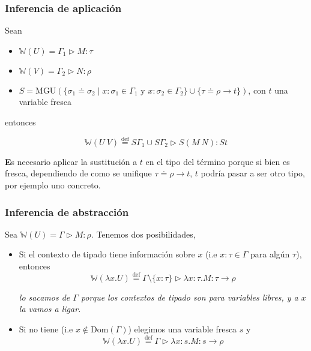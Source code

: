 \documentclass{report}
\theoremstyle{definition} %
\newenvironment{nota}[1]
    {\begin{leftbar}\textbf{#1}}
    {\end{leftbar}}
\newcommand{\eqdef}{\overset{\text{def}}{=}}
\newcommand{\tfunc}[2]{#1 \to #2}
\newcommand{\abs}[3]{\lambda #1 : #2 . #3}
\newcommand{\app}[2]{#1 \ #2} %
\newcommand{\uabs}[2]{\lambda #1 . #2} %
\newcommand{\tipa}[3]{#1 \rhd #2 : #3} %
\newcommand{\tienetipo}[3]{#1 : #2 \in #3}
\newcommand{\Gtipa}[2]{\tipa{\Gamma}{#1}{#2}}
\newcommand{\tsust}[1]{S#1} %
\newcommand{\infer}[1]{\mathbb{W}(#1)}
\newcommand{\unify}[2]{#1 \doteq #2}
\begin{document}
\subsubsection{Inferencia de aplicación}

Sean

\begin{itemize}
    \item $\infer{U} = \tipa{\Gamma_1}{M}{\tau}$
    \item $\infer{V} = \tipa{\Gamma_2}{N}{\rho}$
    \item $S = \text{MGU} (
        \{
            \unify{\sigma_1}{\sigma_2} \mid
            x : \sigma_1 \in \Gamma_1
            \text{ y } x : \sigma_2 \in \Gamma_2
        \}
        \cup \{ \unify{\tau}{\tfunc{\rho}{t}} \}
    )$, con $t$ una variable fresca
\end{itemize}

entonces

\[
    \infer{\app{U}{V}} \eqdef
    \tipa
        {\tsust{\Gamma_1} \cup \tsust{\Gamma_2}}
        {\tsust{(\app{M}{N})}}
        {\tsust{t}}
\]

\begin{nota}
    Es necesario aplicar la sustitución a $t$ en el tipo del término porque si
    bien es fresca, dependiendo de como se unifique
    $\unify{\tau}{\tfunc{\rho}{t}}$, $t$ podría pasar a ser otro tipo, por
    ejemplo uno concreto.
\end{nota}

\subsubsection{Inferencia de abstracción}

Sea $\infer{U} = \Gtipa{M}{\rho}$. Tenemos dos posibilidades,

\begin{itemize}
    \item Si el contexto de tipado tiene información sobre $x$
    (i.e $\tienetipo{x}{\tau}{\Gamma}$ para algún $\tau$), entonces
    \[
        \infer{\uabs{x}{U}} \eqdef
        \tipa
            {\Gamma \setminus \{ x: \tau\}}
            {\abs{x}{\tau}{M}}
            {\tfunc{\tau}{\rho}}
    \]

    \textit{lo sacamos de $\Gamma$ porque los contextos de tipado son para variables libres, y a $x$ la vamos a ligar.}

    \item Si no tiene (i.e $x \notin \text{Dom}({\Gamma})$) elegimos una
    variable fresca $s$ y
    \[
        \infer{\uabs{x}{U}} \eqdef
        \Gtipa
            {\abs{x}{s}{M}}
            {\tfunc{s}{\rho}}
    \]
\end{itemize}
\end{document}
